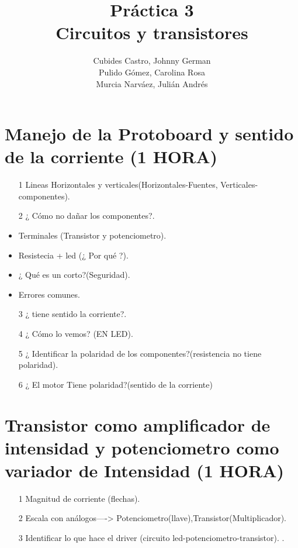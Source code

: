 \documentclass{article}
\title{Práctica 3\\Circuitos y transistores}
\author{Cubides Castro, Johnny German \\
        Pulido Gómez, Carolina Rosa\\Murcia Narváez, Julián Andrés}
\begin{document}
\maketitle
\section{Manejo de la Protoboard y sentido de la corriente (1 HORA) }
\begin{itemize}
\item[1] Lineas Horizontales y verticales(Horizontales-Fuentes, Verticales-componentes).
\item[2] ¿ Cómo no dañar los componentes?.
\item Terminales (Transistor y potenciometro).
\item Resistecia + led (¿ Por qué ?).
\item ¿ Qué es un corto?(Seguridad).
\item Errores comunes.
\item[3]¿ tiene sentido la corriente?.
\item[4]¿ Cómo lo vemos? (EN LED).
\item[5]¿ Identificar la polaridad de los componentes?(resistencia no tiene polaridad).
\item[6]¿ El motor Tiene polaridad?(sentido de la corriente)
\end{itemize}

\section{Transistor como amplificador de intensidad y potenciometro como variador de Intensidad (1 HORA)}
\begin{itemize}
\item[1] Magnitud de corriente (flechas).
\item[2] Escala con análogos----> Potenciometro(llave),Transistor(Multiplicador).
\item[3] Identificar lo que hace el driver (circuito led-potenciometro-transistor).
. 
\end{itemize}






%
\end{document}
